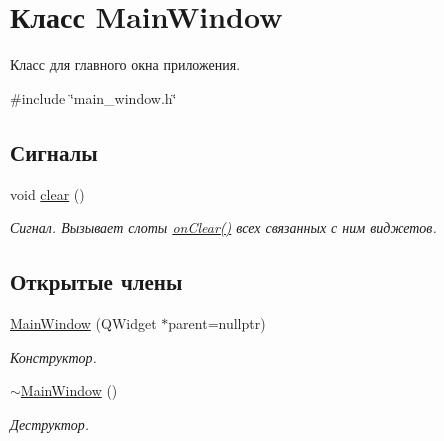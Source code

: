 \hypertarget{class_main_window}{}\section{Класс Main\+Window}
\label{class_main_window}


Класс для главного окна приложения.  




{\ttfamily \#include \char`\"{}main\+\_\+window.\+h\char`\"{}}

\subsection*{Сигналы}
\begin{DoxyCompactItemize}
\item 
void \hyperlink{class_main_window_a77557e32fb4ed3530daf2f6225c877db}{clear} ()\hypertarget{class_main_window_a77557e32fb4ed3530daf2f6225c877db}{}\label{class_main_window_a77557e32fb4ed3530daf2f6225c877db}

\begin{DoxyCompactList}\small\item\em Сигнал. Вызывает слоты \hyperlink{class_main_window_ab1db88110806edae5fc7a1d7a24267f7}{on\+Clear()} всех связанных с ним виджетов. \end{DoxyCompactList}\end{DoxyCompactItemize}
\subsection*{Открытые члены}
\begin{DoxyCompactItemize}
\item 
\hyperlink{class_main_window_a996c5a2b6f77944776856f08ec30858d}{Main\+Window} (Q\+Widget $\ast$parent=nullptr)\hypertarget{class_main_window_a996c5a2b6f77944776856f08ec30858d}{}\label{class_main_window_a996c5a2b6f77944776856f08ec30858d}

\begin{DoxyCompactList}\small\item\em Конструктор. \end{DoxyCompactList}\item 
\hyperlink{class_main_window_ae98d00a93bc118200eeef9f9bba1dba7}{$\sim$\+Main\+Window} ()\hypertarget{class_main_window_ae98d00a93bc118200eeef9f9bba1dba7}{}\label{class_main_window_ae98d00a93bc118200eeef9f9bba1dba7}

\begin{DoxyCompactList}\small\item\em Деструктор. \end{DoxyCompactList}\end{DoxyCompactItemize}
